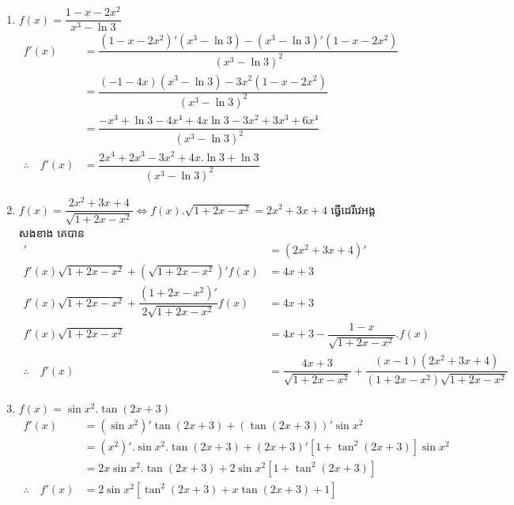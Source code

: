 \documentclass[a4paper,12pt]{article}
\begin{document}
\begin{enumerate}
	\item $f(x)=\dfrac{1-x-2x^2}{x^3-\ln 3}$
	      \begin{align*}
		      f'(x)                  & =\dfrac{(1-x-2x^2)'(x^3-\ln 3)-(x^3-\ln 3)'(1-x-2x^2)}{(x^3-\ln 3)^2} \\
		                             & =\dfrac{(-1-4x)(x^3-\ln 3)-3x^2(1-x-2x^2)}{(x^3-\ln 3)^2}             \\
		                             & =\dfrac{-x^3+\ln 3-4x^4+4x\ln 3 -3x^2+3x^3+6x^4}{(x^3-\ln 3)^2}       \\
		      \therefore \quad f'(x) & =\dfrac{2x^4+2x^3-3x^2+4x.\ln 3+\ln 3}{(x^3-\ln 3)^2}
	      \end{align*}
	\item $f(x)=\dfrac{2x^2+3x+4}{\sqrt{1+2x-x^2}} \Longleftrightarrow f(x).\sqrt{1+2x-x^2}=2x^2+3x+4$ ធ្វើដេរីវេអង្គសងខាង គេបាន
	      \begin{align*}
		      [f(x)\sqrt{1+2x-x^2}]'                                         & =(2x^2+3x+4)'                                                                      \\
		      f'(x)\sqrt{1+2x-x^2}+(\sqrt{1+2x-x^2})'f(x)                    & =4x+3                                                                              \\
		      f'(x)\sqrt{1+2x-x^2}+\dfrac{(1+2x-x^2)'}{2\sqrt{1+2x-x^2}}f(x) & =4x+3                                                                              \\
		      f'(x)\sqrt{1+2x-x^2}                                           & =4x+3-\dfrac{1-x}{\sqrt{1+2x-x^2}}.f(x)                                            \\
		      \therefore \quad f'(x)                                         & =\dfrac{4x+3}{\sqrt{1+2x-x^2}}+\dfrac{(x-1)(2x^2+3x+4)}{(1+2x-x^2)\sqrt{1+2x-x^2}}
	      \end{align*}
	\item $f(x)=\sin x^2.\tan (2x+3)$
	      \begin{align*}
		      f'(x)                  & = (\sin x^2)'\tan (2x+3)+(\tan (2x+3))'\sin x^2                \\
		                             & =(x^2)'.\sin x^2. \tan (2x+3)+(2x+3)'[1+\tan^2 (2x+3)]\sin x^2 \\
		                             & =2x\sin x^2 .\tan (2x+3)+2\sin x^2 [1+\tan^2 (2x+3)]           \\
		      \therefore \quad f'(x) & =2\sin x^2 [\tan^2 (2x+3)+x\tan (2x+3)+1]

\end{align*}
\end{enumerate}
\end{document}
